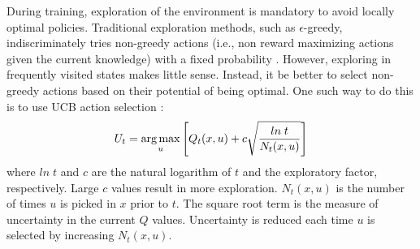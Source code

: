 During training, exploration of the environment is mandatory to avoid locally optimal policies. Traditional exploration methods, such as $\epsilon$-greedy, indiscriminately tries non-greedy actions (i.e., non reward maximizing actions given the current knowledge) with a fixed probability \cite{ref11}. However, exploring in frequently visited states makes little sense. Instead, it be better to select non-greedy actions based on their potential of being optimal. One such way to do this is to use UCB action selection \cite{sutton}:
\begin{equation}
    U_t = \operatorname*{arg\,max}_u \left[Q_t(x, u) + c \sqrt{\frac{ln \; t}{N_t(x, u)}} \right]
\label{eq:ucb}
\end{equation}
where $ln \; t$ and $c$ are the natural logarithm of $t$ and the exploratory factor, respectively. Large $c$ values result in more exploration. $N_t(x, u)$ is the number of times $u$ is picked in $x$ prior to $t$.  The square root term is the measure of uncertainty in the current $Q$ values.  Uncertainty is reduced each time $u$ is selected by increasing $N_t(x, u)$.

